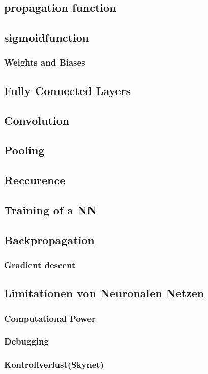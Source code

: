 \documentclass{thesisclass}
\begin{document}
\subsection{propagation function}
\subsection{sigmoidfunction}
\subsubsection{Weights and Biases}
\subsection{Fully Connected Layers}
\subsection{Convolution}
\subsection{Pooling}
\subsection{Reccurence}
\subsection{Training of a NN}
\subsection{Backpropagation}
\subsubsection{Gradient descent}
\subsection{Limitationen von Neuronalen Netzen}
\subsubsection{Computational Power}
\subsubsection{Debugging}
\subsubsection{Kontrollverlust(Skynet)}
\end{document}
